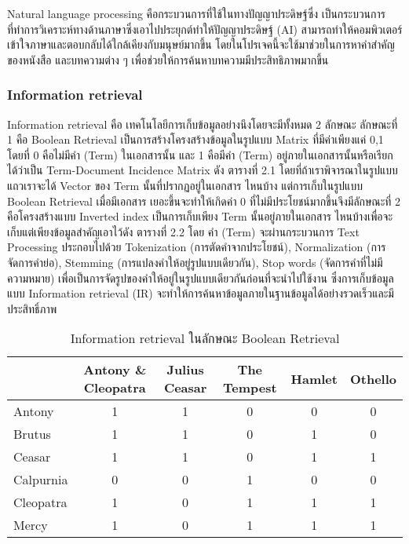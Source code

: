 Natural language processing คือกระบวนการที่ใช้ในทางปัญญาประดิษฐ์ซึ่ง เป็นกระบวนการที่ทำการวิเคราะห์ทางด้านภาษาซึ่งเอาไปประยุกต์ทำให้ปัญญาประดิษฐ์ (AI) สามารถทำให้คอมพิวเตอร์เข้าใจภาษาและตอบกลับได้ใกล้เคียงกับมนุษย์มากขึ้น โดยในโปรเจคนี้จะใช้มาช่วยในการหาคำสำคัญของหนังสือ และบทความต่าง ๆ เพื่อช่วยให้การค้นหาบทความมีประสิทธิภาพมากขึ้น

\subsubsection{Information retrieval}

Information retrieval คือ เทคโนโลยีการเก็บข้อมูลอย่างนึงโดยจะมีทั้งหมด 2 ลักษณะ ลักษณะที่ 1 คือ Boolean Retrieval เป็นการสร้างโครงสร้างข้อมูลในรูปแบบ Matrix ที่มีค่าเพียงแค่ 0,1 โดยที่ 0 คือไม่มีคำ (Term) ในเอกสารนั้น และ 1 คือมีคำ (Term) อยู่ภายในเอกสารนั้นหรือเรียกได้ว่าเป็น Term-Document Incidence  Matrix ดัง ตารางที่ 2.1 โดยที่ถ้าเราพิจารณาในรูปแบบแถวเราจะได้ Vector ของ Term นั้นที่ปรากฏอยู่ในเอกสาร ไหนบ้าง แต่การเก็บในรูปแบบ Boolean Retrieval เมื่อมีเอกสาร เยอะขึ้นจะทำให้เกิดค่า 0 ที่ไม่มีประโยชน์มากขึ้นจึงมีลักษณะที่ 2 คือโครงสร้างแบบ Inverted index เป็นการเก็บเพียง Term นั้นอยู่ภายในเอกสาร ไหนบ้างเพื่อจะเก็บแต่เพียงข้อมูลสำคัญเอาไว้ดัง ตารางที่ 2.2 โดย คำ (Term) จะผ่านกระบวนการ Text Processing ประกอบไปด้วย Tokenization (การตัดคำจากประโยชน์), Normalization (การจัดการคำย่อ), Stemming (การแปลงคำให้อยู่รูปแบบเดียวกัน), Stop words (จัดการคำที่ไม่มีความหมาย) เพื่อเป็นการจัดรูปของคำให้อยู่ในรูปแบบเดียวกันก่อนที่จะนำไปใช้งาน ซึ่งการเก็บข้อมูลแบบ Information retrieval (IR) จะทำให้การค้นหาข้อมูลภายในฐานข้อมูลได้อย่างรวดเร็วและมีประสิทธิ์ภาพ
\begin{table}[H]
\caption{Information retrieval ในลักษณะ Boolean Retrieval}\label{tbl:ir}
    \begin{tabular}{|l|c|c|c|c|c|}
        \hline
                  & Antony \& Cleopatra & Julius Ceasar & The Tempest & Hamlet & Othello \\ \hline
        Antony    & 1                   & 1             & 0           & 0      & 0       \\ \hline
        Brutus    & 1                   & 1             & 0           & 1      & 0       \\ \hline
        Ceasar    & 1                   & 1             & 0           & 1      & 1       \\ \hline
        Calpurnia & 0                   & 0             & 1           & 0      & 0       \\ \hline
        Cleopatra & 1                   & 0             & 1           & 1      & 1       \\ \hline
        Mercy     & 1                   & 0             & 1           & 1      & 1       \\ \hline
        \end{tabular}
\end{table}

